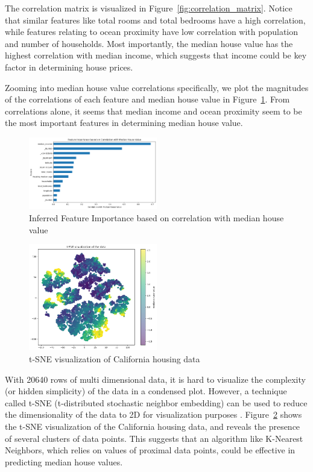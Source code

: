 \documentclass[letterpaper,twocolumn,10pt]{article}
\begin{document}
The correlation matrix is visualized in Figure~\ref{fig:correlation_matrix}. Notice that similar features like total rooms and total bedrooms have a high correlation, while features relating to ocean proximity have low correlation with population and number of households.
Most importantly, the median house value has the highest correlation with median income, which suggests that income could be key factor in determining house prices.


Zooming into median house value correlations specifically, we plot the magnitudes of the correlations of each feature and median house value in Figure~\ref{fig:correlation_mhv}.
From correlations alone, it seems that median income and ocean proximity seem to be the most important features in determining median house value.
\begin{figure}
    \centering
    \includegraphics[width=0.5\textwidth]{images/feature_import_corr.png}
    \caption{Inferred Feature Importance based on correlation with median house value}
    \label{fig:correlation_mhv}
\end{figure}

\begin{figure}%
    \centering
    \includegraphics[width=0.5\textwidth]{images/tsne.png}
    \caption{t-SNE visualization of California housing data}
    \label{fig:tsne}
\end{figure}

With 20640 rows of multi dimensional data, it is hard to visualize the complexity (or hidden simplicity) of the data in a condensed plot.
However, a technique called t-SNE (t-distributed stochastic neighbor embedding) can be used to reduce the dimensionality of the data to 2D for visualization purposes \cite{tsne}. 
Figure~\ref{fig:tsne} shows the t-SNE visualization of the California housing data, and reveals the presence of several clusters of data points. This suggests that an algorithm like K-Nearest Neighbors, which relies on values of proximal data points, could be effective in predicting median house values.
\end{document}
